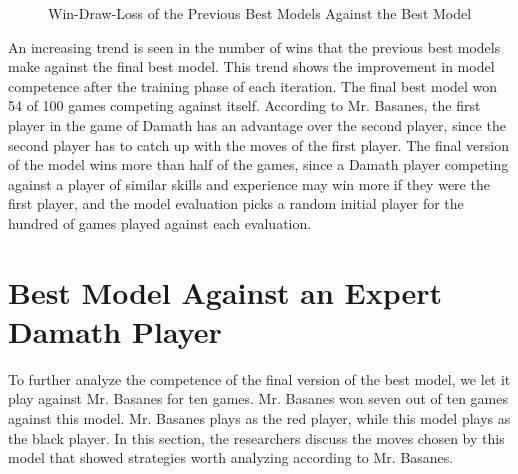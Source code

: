 \wdlevaldata
    
\begin{figure}[H]
    \centering
    \caption{Win-Draw-Loss of the Previous Best Models Against the Best Model}
    \label{fig:wdl-eval}
\end{figure}

An increasing trend is seen in the number of wins that the previous best models make against the final best model. This trend shows the improvement in model competence after the training phase of each iteration. The final best model won 54 of 100 games competing against itself. According to Mr. Basanes, the first player in the game of Damath has an advantage over the second player, since the second player has to catch up with the moves of the first player. The final version of the model wins more than half of the games, since a Damath player competing against a player of similar skills and experience may win more if they were the first player, and the model evaluation picks a random initial player for the hundred of games played against each evaluation.

\section{Best Model Against an Expert Damath Player}

To further analyze the competence of the final version of the best model, we let it play against Mr. Basanes for ten games. Mr. Basanes won seven out of ten games against this model. Mr. Basanes plays as the red player, while this model plays as the black player. In this section, the researchers discuss the moves chosen by this model that showed strategies worth analyzing according to Mr. Basanes.

